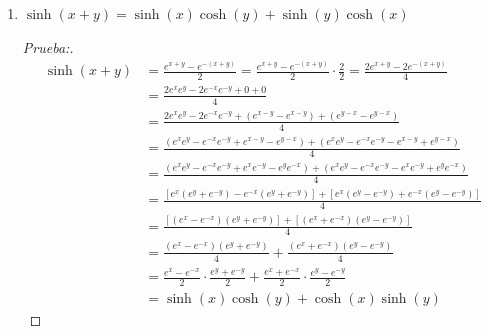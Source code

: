 \documentclass[12pt]{article}
\begin{document}
\begin{enumerate}[\hspace{9px} a)]
\begin{proof}[Prueba:]
        Usando derivaci\'on logar\'itmica:
        \begin{align*}
            \ln(\tanh(x)) &= \ln\left(\frac{\sinh(x)}{\cosh(x)}\right) = \ln(\sinh(x))-\ln(\cosh(x))\\
            \frac{d}{dx}\big(\ln(\tanh(x))\big) &= \frac{d}{dx}\big[\ln(\sinh(x))-\ln(\cosh(x))\big]\\
            \frac{\tanh'(x)}{\tanh(x)} &= \frac{\sinh'(x)}{\sinh(x)} - \frac{\cosh'(x)}{\cosh(x)} =\frac{\cosh(x)}{\sinh(x)} - \frac{\sinh(x)}{\cosh(x)}\\
            \tanh'(x) &= \tanh(x)\left[\frac{\cosh(x)}{\sinh(x)} - \frac{\sinh(x)}{\cosh(x)}\right] = \frac{\sinh(x)}{\cosh(x)}\left[\frac{\cosh(x)}{\sinh(x)} - \frac{\sinh(x)}{\cosh(x)}\right]\\
            &= \frac{\sinh(x)}{\cosh(x)}\cdot\frac{\cosh(x)}{\sinh(x)} - \frac{\sinh(x)}{\cosh(x)}\cdot\frac{\sinh(x)}{\cosh(x)} = 1-\frac{\sinh^2(x)}{\cosh^2(x)}\\
            &= \frac{\cosh^2(x)}{\cosh^2(x)} - \frac{\sinh^2(x)}{\cosh^2(x)} = \frac{\cosh^2(x)-\sinh^2(x)}{\cosh^2(x)}\\
            &= \frac{1}{\cosh^2(x)} \quad \text{(Por el inciso a)}
        \end{align*}
    \end{proof}


    \item \(\sinh(x+y)=\sinh(x)\cosh(y)+\sinh(y)\cosh(x)\)
    
    \begin{proof}[Prueba:]
        \begin{align*}
            \sinh(x+y) &= \frac{e^{x+y}-e^{-(x+y)}}{2} = \frac{e^{x+y}-e^{-(x+y)}}{2}\cdot\frac{2}{2} = \frac{2e^{x+y}-2e^{-(x+y)}}{4} \\
            &= \frac{2e^xe^y-2e^{-x}e^{-y}+0+0}{4}\\
            &= \frac{2e^xe^y-2e^{-x}e^{-y}+(e^{x-y}-e^{x-y})+(e^{y-x}-e^{y-x})}{4}\\
            &= \frac{(e^xe^y-e^{-x}e^{-y}+e^{x-y}-e^{y-x})+(e^xe^y-e^{-x}e^{-y}-e^{x-y}+e^{y-x})}{4}\\
            &= \frac{(e^xe^y-e^{-x}e^{-y}+e^xe^{-y}-e^ye^{-x})+(e^xe^y-e^{-x}e^{-y}-e^xe^{-y}+e^ye^{-x})}{4}\\
            &= \frac{[e^x(e^y+e^{-y})-e^{-x}(e^y+e^{-y})]+[e^x(e^y-e^{-y})+e^{-x}(e^y-e^{-y})]}{4}\\
            &= \frac{[(e^x-e^{-x})(e^y+e^{-y})]+[(e^x+e^{-x})(e^y-e^{-y})]}{4}\\
            &= \frac{(e^x-e^{-x})(e^y+e^{-y})}{4}+\frac{(e^x+e^{-x})(e^y-e^{-y})}{4}\\
            &= \frac{e^x-e^{-x}}{2}\cdot\frac{e^y+e^{-y}}{2}+\frac{e^x+e^{-x}}{2}\cdot\frac{e^y-e^{-y}}{2}\\
            &= \sinh(x)\cosh(y)+\cosh(x)\sinh(y)
        \end{align*}
    \end{proof}


\end{enumerate}
\end{document}
